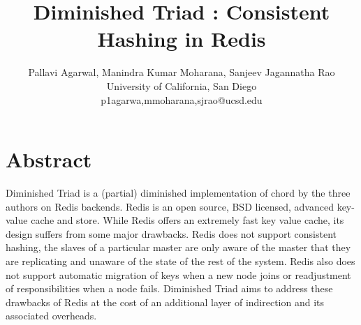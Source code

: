 \documentclass[10pt,twocolumn,letterpaper]{article}
\begin{document}
\title{Diminished Triad : Consistent Hashing in Redis}

\author{Pallavi Agarwal, Manindra Kumar Moharana, Sanjeev Jagannatha Rao\\
University of California, San Diego\\
\small p1agarwa,mmoharana,sjrao@ucsd.edu}



\maketitle


\section{Abstract}
Diminished Triad is a (partial) diminished implementation of chord by the three authors on Redis backends. Redis is an open source, BSD licensed, advanced key-value cache and store.
While Redis offers an extremely fast key value cache, its design suffers from some major drawbacks. Redis does not support consistent hashing, the slaves of a particular master are only aware of the master that they are replicating and unaware of the state of the rest of the system. Redis also does not support automatic migration of keys when a new node joins or readjustment of responsibilities when a node fails. Diminished Triad aims to address these drawbacks of Redis at the cost of an additional layer of indirection and its associated overheads.
\end{document}
